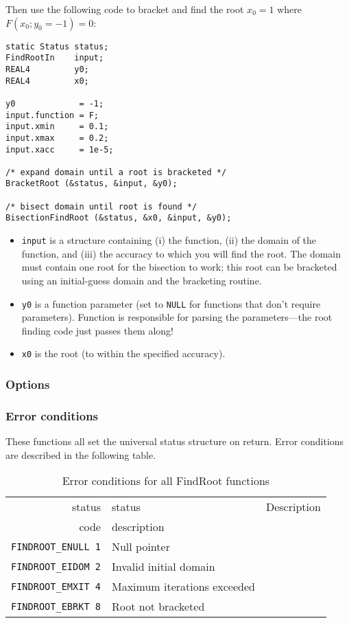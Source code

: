 \documentclass{article}
\begin{document}
Then use the following code to bracket and find the root $x_0=1$ where
$F(x_0;y_0=-1)=0$:
\begin{verbatim}
static Status status;
FindRootIn    input;
REAL4         y0;
REAL4         x0;

y0             = -1;
input.function = F;
input.xmin     = 0.1;
input.xmax     = 0.2;
input.xacc     = 1e-5;

/* expand domain until a root is bracketed */
BracketRoot (&status, &input, &y0);

/* bisect domain until root is found */
BisectionFindRoot (&status, &x0, &input, &y0);
\end{verbatim}

\begin{itemize}
\item\verb+input+ is a structure containing (i) the function, (ii) the domain
of the function, and (iii) the accuracy to which you will find the root.  The
domain must contain one root for the bisection to work; this root can be
bracketed using an initial-guess domain and the bracketing routine.
\item\verb+y0+ is a function parameter (set to \verb+NULL+ for functions that
don't require parameters).  Function is responsible for parsing the
parameters---the root finding code just passes them along!
\item\verb+x0+ is the root (to within the specified accuracy).
\end{itemize}

\subsubsection{Options}

\subsubsection{Error conditions}

These functions all set the universal status structure on return.
Error conditions are described in the following table.

\begin{table}
\begin{tabular}{|r|l|p{2in}|}\hline
status  & status          & Description\\
code    & description     & \\\hline
\verb+FINDROOT_ENULL 1+ & Null pointer & \\
\verb+FINDROOT_EIDOM 2+ & Invalid initial domain & \\
\verb+FINDROOT_EMXIT 4+ & Maximum iterations exceeded & \\
\verb+FINDROOT_EBRKT 8+ & Root not bracketed & \\
\hline
\end{tabular}
\caption{Error conditions for all FindRoot functions}\label{tbl:CV}
\end{table}
\end{document}
